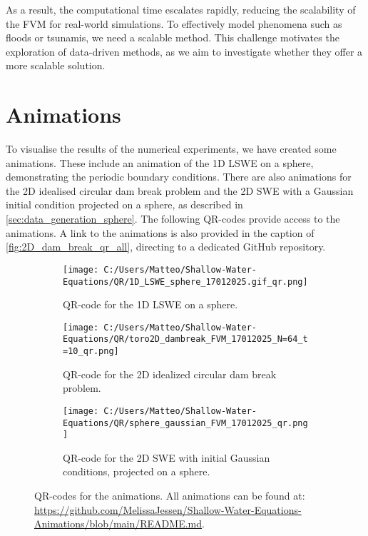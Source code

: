 As a result, the computational time escalates rapidly, reducing the scalability of the FVM for real-world simulations.
To effectively model phenomena such as floods or tsunamis, we need a scalable method.
This challenge motivates the exploration of data-driven methods, as we aim to investigate whether they offer a more scalable solution.

\section{Animations}\label{sec:animations}
To visualise the results of the numerical experiments, we have created some animations.
These include an animation of the 1D LSWE on a sphere, demonstrating the periodic boundary conditions.
There are also animations for the 2D idealised circular dam break problem and the 2D SWE with a Gaussian initial condition projected on a sphere, as described in \autoref{sec:data_generation_sphere}.
The following QR-codes provide access to the animations.
A link to the animations is also provided in the caption of \autoref{fig:2D_dam_break_qr_all}, directing to a dedicated GitHub repository.
\begin{figure}[H]
    \centering
    \begin{subfigure}{0.25\textwidth}
        \begin{minipage}[t]{\textwidth}
            \centering
            \texttt{[image: C:/Users/Matteo/Shallow-Water-Equations/QR/1D\_LSWE\_sphere\_17012025.gif\_qr.png]}
            \caption{QR-code for the 1D LSWE on a sphere.}\label{fig:1D_LSWE_sphere_qr}
        \end{minipage}
    \end{subfigure}
    \hspace{1cm}
    \begin{subfigure}{0.25\textwidth}
        \begin{minipage}[t]{\textwidth}
            \centering
            \texttt{[image: C:/Users/Matteo/Shallow-Water-Equations/QR/toro2D\_dambreak\_FVM\_17012025\_N=64\_t=10\_qr.png]}
            \caption{QR-code for the 2D idealized circular dam break problem.}\label{fig:2D_dam_break_qr}
        \end{minipage}
    \end{subfigure}
    \hspace{1cm}
    \begin{subfigure}{0.25\textwidth}
        \begin{minipage}[t]{\textwidth}
            \centering
            \texttt{[image: C:/Users/Matteo/Shallow-Water-Equations/QR/sphere\_gaussian\_FVM\_17012025\_qr.png]}
            \caption{QR-code for the 2D SWE with initial Gaussian conditions, projected on a sphere.}\label{fig:2D_dam_break_qr_part2}
        \end{minipage}
    \end{subfigure}
    \caption{QR-codes for the animations.
            All animations can be found at: \url{https://github.com/MelissaJessen/Shallow-Water-Equations-Animations/blob/main/README.md}.}\label{fig:2D_dam_break_qr_all}
\end{figure}
